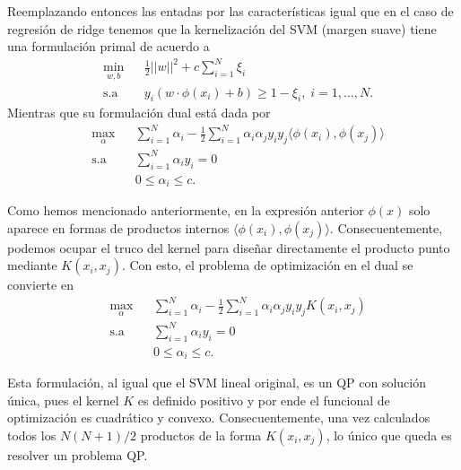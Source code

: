 Reemplazando entonces las entadas por las características igual que en el caso de regresión de ridge tenemos que la kernelización del SVM (margen suave) tiene una formulación primal de acuerdo a 
\begin{equation*}
\begin{aligned}
& \underset{w,b}{\text{min}}
& & \frac{1}{2}||w||^2 + c\sum\limits_{i=1}^{N} \xi_i\\
& \text{s.a}
& & y_i (w\cdot \phi(x_i) +b) \geq 1- \xi_i, \; i = 1, \ldots, N.
\end{aligned}
\end{equation*}
Mientras que su formulación dual está dada por
\begin{equation*}
\begin{aligned}
& \underset{\alpha}{\text{max}}
& & \sum\limits_{i=1}^{N}\alpha_i - \frac{1}{2} \sum\limits_{i=1}^{N} \alpha_i \alpha_j y_i y_j \langle\phi(x_i), \phi(x_j)\rangle\\
& \text{s.a}
& & \sum\limits_{i=1}^{N} \alpha_i y_i= 0 \\
& &  &0 \leq \alpha_i \leq c.
\end{aligned}
\end{equation*}

Como hemos mencionado anteriormente, en la expresión anterior $\phi(x)$ solo aparece en formas de productos internos $\langle \phi(x_i), \phi(x_j)\rangle$. Consecuentemente, podemos ocupar el truco del kernel para diseñar directamente el producto punto mediante $K(x_i,x_j)$. Con esto, el problema de optimización en el dual se convierte en 
\begin{equation*}
\begin{aligned}
& \underset{\alpha}{\text{max}}
& & \sum\limits_{i=1}^{N}\alpha_i - \frac{1}{2} \sum\limits_{i=1}^{N} \alpha_i \alpha_j y_i y_j K(x_i, x_j)\\
& \text{s.a}
& & \sum\limits_{i=1}^{N} \alpha_i y_i= 0 \\
& &  &0 \leq \alpha_i \leq c.
\end{aligned}
\end{equation*}

\begin{remark}
Esta formulación, al igual que el SVM lineal original, es un QP  con solución única, pues  el kernel $K$ es definido positivo y por ende el funcional de optimización es cuadrático y convexo. Consecuentemente, una vez calculados todos los $N(N+1)/2$ productos de la forma $K(x_i, x_j)$, lo único que queda es resolver un problema QP.
\end{remark}


